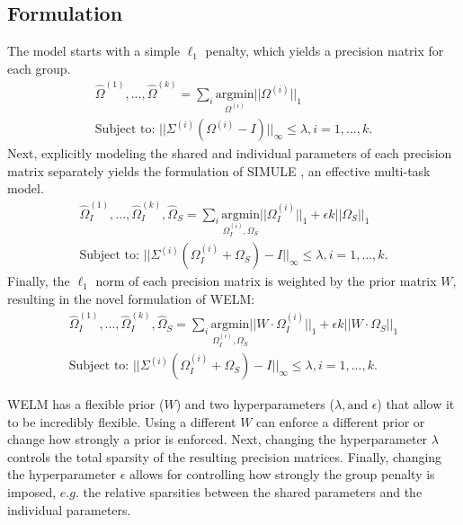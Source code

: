 \documentclass{article}
\begin{document}
\subsection{Formulation}
The model starts with a simple $\ell_1$ penalty, which yields a precision matrix for each group.
\begin{equation}
\label{eq:model_simule}
\begin{split}
\hat{\Omega}^{(1)},...,\hat{\Omega}^{(k)} = \underset{i}{\sum} \underset{\Omega^{(i)}}{\text{argmin}} || \Omega^{(i)} ||_1\\
\text{Subject to: } ||\Sigma^{(i)} (\Omega^{(i)} - I)|| _{\infty} \leq \lambda, i=1,...,k.
\end{split}
\end{equation}
Next, explicitly modeling the shared and individual parameters of each precision matrix separately yields the formulation of SIMULE \cite{wang2016constrained}, an effective multi-task model.
\begin{equation}
\label{eq:model_simule}
\begin{split}
\hat{\Omega}^{(1)}_I,...,\hat{\Omega}^{(k)}_I,\hat{\Omega}_S = \underset{i}{\sum} \underset{\Omega_I^{(i)},\Omega_S}{\text{argmin}} || \Omega_I^{(i)} ||_1  + \epsilon k|| \Omega_S  ||_1 \\
\text{Subject to: } ||\Sigma^{(i)} (\Omega_I^{(i)}+\Omega_S) - I|| _{\infty} \leq \lambda, i=1,...,k.
\end{split}
\end{equation}
Finally, the $\ell_1$ norm of each precision matrix is weighted by the prior matrix $W$, resulting in the novel formulation of WELM:
\begin{equation}
\label{eq:model_formulation}
\begin{split}
\hat{\Omega}^{(1)}_I,...,\hat{\Omega}^{(k)}_I,\hat{\Omega}_S = \underset{i}{\sum} \underset{\Omega_I^{(i)},\Omega_S}{\text{argmin}} || W \cdot \Omega_I^{(i)} ||_1  + \epsilon k|| W \cdot \Omega_S  ||_1 \\
\text{Subject to: } ||\Sigma^{(i)} (\Omega_I^{(i)}+\Omega_S) - I|| _{\infty} \leq \lambda, i=1,...,k.
\end{split}
\end{equation}

WELM has a flexible prior ($W$) and two hyperparameters ($\lambda,\text{and }\epsilon$) that allow it to be incredibly flexible. Using a different $W$ can enforce a different prior or change how strongly a prior is enforced. Next, changing the hyperparameter $\lambda$ controls the total sparsity of the resulting precision matrices. Finally, changing the hyperparameter $\epsilon$ allows for controlling how strongly the group penalty is imposed, $e.g.$ the relative sparsities between the shared parameters and the individual parameters.
\end{document}
